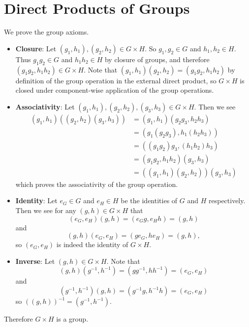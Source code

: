 \section{Direct Products of Groups}
\begin{questions}
    \item We prove the group axioms.
    \begin{itemize}
        \item \textbf{Closure}: Let $(g_1, h_1), (g_2, h_2) \in G \times H$. So $g_1, g_2 \in G$ and $h_1, h_2 \in H$. Thus $g_1g_2 \in G$ and $h_1h_2 \in H$ by closure of groups, and therefore $(g_1g_2, h_1h_2) \in G\times H$. Note that $(g_1, h_1)(g_2, h_2) = (g_1g_2, h_1h_2)$ by definition of the group operation in the external direct product, so $G \times H$ is closed under component-wise application of the group operations.
        
        \item \textbf{Associativity}: Let $(g_1, h_1), (g_2, h_2), (g_3, h_3) \in G \times H$. Then we see
        \begin{align*}
            (g_1, h_1)\left((g_2, h_2)(g_3, h_3)\right) &= (g_1, h_1)(g_2g_3, h_2h_3)\\
            &= (g_1(g_2g_3), h_1(h_2h_3))\\
            &= ((g_1g_2)g_3, (h_1h_2)h_3)\\
            &= (g_1g_2, h_1h_2)(g_3,h_3)\\
            &= \left((g_1,h_1)(g_2,h_2)\right)(g_3,h_3)
        \end{align*}
        which proves the associativity of the group operation.
        
        \item \textbf{Identity}: Let $e_G \in G$ and $e_H \in H$ be the identities of $G$ and $H$ respectively. Then we see for any $(g, h) \in G \times H$ that
        \[
            (e_G, e_H)(g, h) = (e_Gg, e_Hh) = (g, h)
        \]
        and
        \[
            (g, h)(e_G, e_H) = (ge_G, he_H) = (g, h),
        \]
        so $(e_G, e_H)$ is indeed the identity of $G \times H$.
        
        \item \textbf{Inverse}: Let $(g, h) \in G \times H$. Note that
        \[
            (g, h)(g^{-1}, h^{-1}) = (gg^{-1}, hh^{-1}) = (e_G, e_H)
        \]
        and
        \[
            (g^{-1}, h^{-1})(g, h) = (g^{-1}g, h^{-1}h) = (e_G, e_H)
        \]
        so $\left((g, h)\right)^{-1} = (g^{-1}, h^{-1})$.
    \end{itemize}
    Therefore $G \times H$ is a group.


\end{questions}
